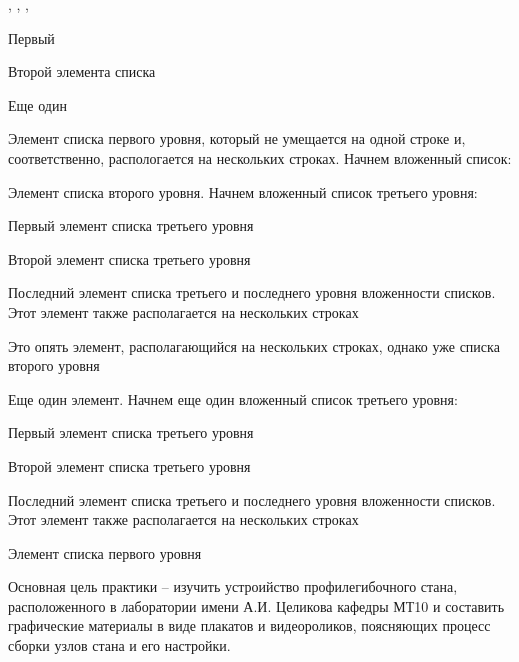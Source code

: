 \documentclass{gostdoc}
\begin{document}
\titlepage

\toc

\abstract
\totalpages, \totalfigures, \totaltables, \totalappendices
\begin{itemlist}
    \item Первый
    \item Второй элемента списка
    \item Еще один
    \item Элемент списка первого уровня, который не умещается на одной строке и, соответственно, распологается на нескольких строках. Начнем вложенный список:
    \begin{itemlist}
        \item Элемент списка второго уровня. Начнем вложенный список третьего уровня:
        \begin{itemlist}
            \item Первый элемент списка третьего уровня
            \item Второй элемент списка третьего уровня
            \item Последний элемент списка третьего и последнего уровня вложенности списков. Этот элемент также располагается на нескольких строках
        \end{itemlist}
        \item Это опять элемент, располагающийся на нескольких строках, однако уже списка второго уровня
        \item Еще один элемент. Начнем еще один вложенный список третьего уровня:
        \begin{itemlist}
            \item Первый элемент списка третьего уровня
            \item Второй элемент списка третьего уровня
            \item Последний элемент списка третьего и последнего уровня вложенности списков. Этот элемент также располагается на нескольких строках
        \end{itemlist}
    \end{itemlist}
    \item Элемент списка первого уровня
\end{itemlist}

\task
\lipsum[12]

\introduction
Основная цель практики – изучить устроийство профилегибочного стана, расположенного в лаборатории имени А.И. Целикова кафедры МТ10 и составить графические материалы в виде плакатов и видеороликов, поясняющих процесс сборки узлов стана и его настройки.
\end{document}
